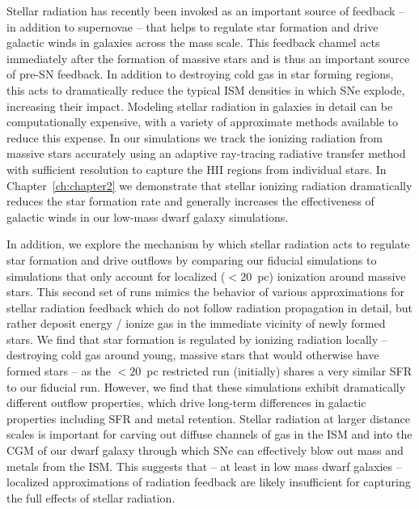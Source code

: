 Stellar radiation has recently been invoked as an important source of feedback -- in addition to supernovae -- that helps to regulate star formation and drive galactic winds in galaxies across the mass scale. This feedback channel acts immediately after the formation of massive stars and is thus an important source of pre-SN feedback. In addition to destroying cold gas in star forming regions, this acts to dramatically reduce the typical ISM densities in which SNe explode, increasing their impact. Modeling stellar radiation in galaxies in detail can be computationally expensive, with a variety of approximate methods available to reduce this expense. In our simulations we track the ionizing radiation from massive stars accurately using an adaptive ray-tracing radiative transfer method with sufficient resolution to capture the HII regions from individual stars. In Chapter~\ref{ch:chapter2} we demonstrate that stellar ionizing radiation dramatically reduces the star formation rate and generally increases the effectiveness of galactic winds in our low-mass dwarf galaxy simulations.

In addition, we explore the mechanism by which stellar radiation acts to regulate star formation and drive outflows by comparing our fiducial simulations to simulations that only account for localized ($< 20$~pc) ionization around massive stars. This second set of runs mimics the behavior of various approximations for stellar radiation feedback which do not follow radiation propagation in detail, but rather deposit energy / ionize gas in the immediate vicinity of newly formed stars. We find that star formation is regulated by ionizing radiation locally -- destroying cold gas around young, massive stars that would otherwise have formed stars -- as the $< 20$~pc restricted run (initially) shares a very similar SFR to our fiducial run. However, we find that these simulations exhibit dramatically different outflow properties, which drive long-term differences in galactic properties including SFR and metal retention. Stellar radiation at larger distance scales is important for carving out diffuse channels of gas in the ISM and into the CGM of our dwarf galaxy through which SNe can effectively blow out mass and metals from the ISM. This suggests that -- at least in low mass dwarf galaxies -- localized approximations of radiation feedback are likely insufficient for capturing the full effects of stellar radiation.


